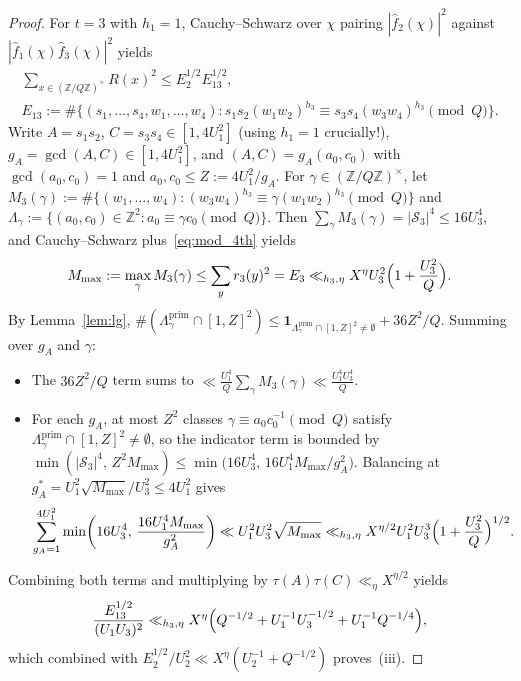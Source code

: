 \documentclass[11pt,a4paper]{amsart}
\theoremstyle{plain}
\theoremstyle{definition}
\theoremstyle{remark}
\newcommand{\Z}{\mathbb{Z}}
\begin{document}
\begin{proof}
For $t = 3$ with $h_1 = 1$, Cauchy--Schwarz over $\chi$ pairing $|\hat{f}_2(\chi)|^2$ against $|\hat{f}_1(\chi)\hat{f}_3(\chi)|^2$ yields
\begin{gather*}
  \sum_{x \in (\Z/Q\Z)^\times} R(x)^2 \le E_2^{1/2} E_{13}^{1/2}, \\
  E_{13} := \#\bigl\{(s_1,\dots,s_4,w_1,\dots,w_4) : s_1 s_2 (w_1 w_2)^{h_3} \equiv s_3 s_4 (w_3 w_4)^{h_3} \pmod Q\bigr\}.
\end{gather*}
Write $A = s_1 s_2$, $C = s_3 s_4 \in [1, 4 U_1^2]$ (using $h_1 = 1$ crucially!), $g_A = \gcd(A, C) \in [1, 4 U_1^2]$, and $(A, C) = g_A (a_0, c_0)$ with $\gcd(a_0, c_0) = 1$ and $a_0, c_0 \le Z := 4 U_1^2 / g_A$. For $\gamma \in (\Z/Q\Z)^\times$, let $M_3(\gamma) := \#\{(w_1,\dots,w_4) : (w_3 w_4)^{h_3} \equiv \gamma (w_1 w_2)^{h_3} \pmod Q\}$ and $\Lambda_\gamma := \{(a_0,c_0) \in \Z^2 : a_0 \equiv \gamma c_0 \pmod Q\}$. Then $\sum_\gamma M_3(\gamma) = |\mathcal{S}_3|^4 \le 16 U_3^4$, and Cauchy--Schwarz plus~\eqref{eq:mod_4th} yields
\[
  M_{\max} := \max_\gamma M_3(\gamma) \le \sum_y r_3(y)^2 = E_3 \ll_{h_3,\eta} X^\eta U_3^2\Bigl(1 + \frac{U_3^2}{Q}\Bigr).
\]
By Lemma~\ref{lem:lg}, $\#(\Lambda_\gamma^{\mathrm{prim}} \cap [1, Z]^2) \le \mathbf{1}_{\Lambda_\gamma^{\mathrm{prim}} \cap [1,Z]^2 \neq \emptyset} + 36 Z^2 / Q$. Summing over $g_A$ and $\gamma$:
\begin{itemize}[itemsep=1pt]
\item The $36 Z^2/Q$ term sums to $\ll \frac{U_1^4}{Q} \sum_\gamma M_3(\gamma) \ll \frac{U_1^4 U_3^4}{Q}$.
\item For each $g_A$, at most $Z^2$ classes $\gamma \equiv a_0 c_0^{-1} \pmod Q$ satisfy $\Lambda_\gamma^{\mathrm{prim}} \cap [1,Z]^2 \neq \emptyset$, so the indicator term is bounded by $\min(|\mathcal{S}_3|^4,\, Z^2 M_{\max}) \le \min\bigl(16 U_3^4,\, 16 U_1^4 M_{\max} / g_A^2\bigr)$. Balancing at $g_A^* = U_1^2 \sqrt{M_{\max}}/U_3^2 \le 4 U_1^2$ gives
\[
  \sum_{g_A = 1}^{4 U_1^2} \min\!\left(16 U_3^4,\, \frac{16 U_1^4 M_{\max}}{g_A^2}\right)
  \ll U_1^2 U_3^2 \sqrt{M_{\max}}
  \ll_{h_3,\eta} X^{\eta/2} U_1^2 U_3^3 \Bigl(1 + \frac{U_3^2}{Q}\Bigr)^{1/2}.
\]
\end{itemize}
Combining both terms and multiplying by $\tau(A)\tau(C) \ll_\eta X^{\eta/2}$ yields
\[
  \frac{E_{13}^{1/2}}{(U_1 U_3)^2} \ll_{h_3,\eta} X^\eta \Bigl(Q^{-1/2} + U_1^{-1} U_3^{-1/2} + U_1^{-1} Q^{-1/4}\Bigr),
\]
which combined with $E_2^{1/2}/U_2^2 \ll X^\eta(U_2^{-1} + Q^{-1/2})$ proves~(iii).
\end{proof}
\end{document}
